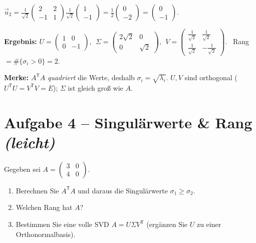 \documentclass[a4paper,11pt]{article}
\newcommand{\transp}{^{\mathsf{T}}}
\newcommand{\schwierig}[1]{\hfill\textnormal{\color{accent2}\itshape (#1)}}
\newcommand{\transp}{^{\mathsf{T}}}
\newcommand{\schwierig}[1]{\hfill\textnormal{\color{accent2}\itshape (#1)}}
\begin{document}
{$\vec u_2=\tfrac{1}{\sqrt2}\!\begin{pmatrix}2&2\\-1&1\end{pmatrix}\!\tfrac{1}{\sqrt2}\!\begin{pmatrix}1\\-1\end{pmatrix}
=\tfrac{1}{2}\begin{pmatrix}0\\-2\end{pmatrix}=\begin{pmatrix}0\\-1\end{pmatrix}$.
\par\smallskip
\textbf{Ergebnis:}\quad
$U=\begin{pmatrix} 1 & 0\\ 0 & -1\end{pmatrix},\ \
\Sigma=\begin{pmatrix} 2\sqrt2 & 0\\ 0 & \sqrt2\end{pmatrix},\ \
V=\begin{pmatrix} \tfrac{1}{\sqrt2} & \tfrac{1}{\sqrt2}\\[2pt] \tfrac{1}{\sqrt2} & -\tfrac{1}{\sqrt2}\end{pmatrix}.$
\ Rang $=\#\{\sigma_i>0\}=2$.}

\medskip
\textbf{Merke:} $A\transp A$ \emph{quadriert} die Werte, deshalb $\sigma_i=\sqrt{\lambda_i}$.
$U,V$ sind orthogonal ($U\transp U=V\transp V=E$); $\Sigma$ ist gleich groß wie $A$.

\clearpage
\section*{Aufgabe 4 \;--\; Singulärwerte \& Rang \schwierig{leicht}}

Gegeben sei $A=\begin{pmatrix} 3 & 0\\ 4 & 0\end{pmatrix}$.
\begin{enumerate}[label=\alph*)]
  \item Berechnen Sie $A\transp A$ und daraus die Singulärwerte $\sigma_1\ge\sigma_2$.
  \item Welchen Rang hat $A$?
  \item Bestimmen Sie eine volle SVD $A=U\Sigma V\transp$ (ergänzen Sie $U$ zu einer
        Orthonormalbasis).
\end{enumerate}
\end{document}
